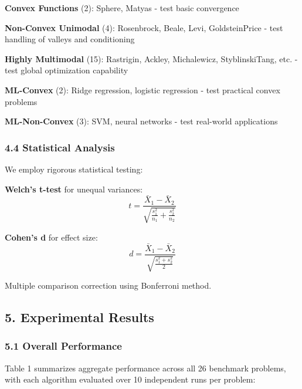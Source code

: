 \textbf{Convex Functions} (2): Sphere, Matyas - test basic convergence

\textbf{Non-Convex Unimodal} (4): Rosenbrock, Beale, Levi, GoldsteinPrice - test handling of valleys and conditioning

\textbf{Highly Multimodal} (15): Rastrigin, Ackley, Michalewicz, StyblinskiTang, etc. - test global optimization capability

\textbf{ML-Convex} (2): Ridge regression, logistic regression - test practical convex problems

\textbf{ML-Non-Convex} (3): SVM, neural networks - test real-world applications

\hypertarget{statistical-analysis}{%
\subsubsection{4.4 Statistical Analysis}\label{statistical-analysis}}

We employ rigorous statistical testing:

\textbf{Welch's t-test} for unequal variances:
\[t = \frac{\bar{X}_1 - \bar{X}_2}{\sqrt{\frac{s_1^2}{n_1} + \frac{s_2^2}{n_2}}}\]

\textbf{Cohen's d} for effect size:
\[d = \frac{\bar{X}_1 - \bar{X}_2}{\sqrt{\frac{s_1^2 + s_2^2}{2}}}\]

Multiple comparison correction using Bonferroni method.

\hypertarget{experimental-results}{%
\subsection{5. Experimental Results}\label{experimental-results}}

\hypertarget{overall-performance}{%
\subsubsection{5.1 Overall Performance}\label{overall-performance}}

Table 1 summarizes aggregate performance across all 26 benchmark problems, with each algorithm evaluated over 10
independent runs per problem:

